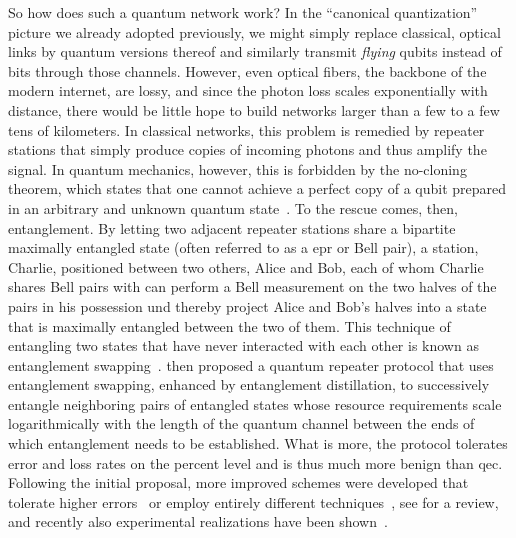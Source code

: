 So how does such a quantum network work?
In the \enquote{canonical quantization} picture we already adopted previously, we might simply replace classical, optical links by quantum versions thereof and similarly transmit \emph{flying} qubits instead of bits through those channels.
However, even optical fibers, the backbone of the modern internet, are lossy, and since the photon loss scales exponentially with distance, there would be little hope to build networks larger than a few to a few tens of kilometers.
In classical networks, this problem is remedied by repeater stations that simply produce copies of incoming photons and thus amplify the signal.
In quantum mechanics, however, this is forbidden by the no-cloning theorem, which states that one cannot achieve a perfect copy of a qubit prepared in an arbitrary and unknown quantum state~\cite{Wootters1982,Dieks1982}.
To the rescue comes, then, entanglement.
By letting two adjacent repeater stations share a bipartite maximally entangled state (often referred to as a \gls{epr} or Bell pair), a station, Charlie, positioned between two others, Alice and Bob, each of whom Charlie shares Bell pairs with can perform a Bell measurement on the two halves of the pairs in his possession und thereby project Alice and Bob's halves into a state that is maximally entangled between the two of them.
This technique of entangling two states that have never interacted with each other is known as entanglement swapping~\cite{Zukowski1993,Pan1998}.
\citet{Briegel1998,Dur1999} then proposed a quantum repeater protocol that uses entanglement swapping, enhanced by entanglement distillation,
to successively entangle neighboring pairs of entangled states whose resource requirements scale logarithmically with the length of the quantum channel between the ends of which entanglement needs to be established.
What is more, the protocol tolerates error and loss rates on the percent level and is thus much more benign than \gls{qec}.
Following the initial proposal, more improved schemes were developed that tolerate higher errors~\cite{Dur2007} or employ entirely different techniques~\cite{Bayrakci2022}, see  for a review, and recently also experimental realizations have been shown~\cite{Krutyanskiy2023}.

